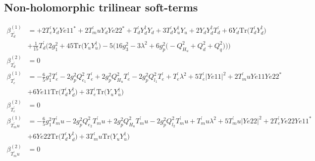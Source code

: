 \subsection{Non-holomorphic trilinear soft-terms}
{\allowdisplaybreaks  \begin{align} 
\beta_{T^{\prime}_d}^{(1)} & =  
+2 T^{\prime}_e Y_d Ye11^* +2 T^{\prime}_mu Y_d Ye22^* +{T^{\prime}_d  Y_{d}^{\dagger}  Y_d}+3 {T^{\prime}_d  Y_{u}^{\dagger}  Y_u} +2 {Y_d  Y_{d}^{\dagger}  T^{\prime}_d} +6 Y_d \mbox{Tr}\Big({T^{\prime}_d  Y_{d}^{\dagger}}\Big) \nonumber \\ 
 &+\frac{1}{15} T^{\prime}_d \Big(2 g_{1}^{2}  + 45 \mbox{Tr}\Big({Y_u  Y_{u}^{\dagger}}\Big)  -5 \Big(16 g_{3}^{2}  -3 \lambda^{2}  + 6 g_{p}^{2} \Big(- Q_{H_u}^{2}  + Q_{d}^{2} + Q_{q}^{2}\Big)\Big)\Big)\\ 
\beta_{T^{\prime}_d}^{(2)} & =  
0\\ 
\beta_{T^{\prime}_e}^{(1)} & =  
-\frac{6}{5} g_{1}^{2} T^{\prime}_e -2 g_{p}^{2} Q_{e_{1}}^{2} T^{\prime}_e +2 g_{p}^{2} Q_{H_u}^{2} T^{\prime}_e -2 g_{p}^{2} Q_{l_1}^{2} T^{\prime}_e +T^{\prime}_e \lambda^{2} +5 T^{\prime}_e |Ye11|^2 +2 T^{\prime}_mu Ye11 Ye22^* \nonumber \\ 
 &+6 Ye11 \mbox{Tr}\Big({T^{\prime}_d  Y_{d}^{\dagger}}\Big) +3 T^{\prime}_e \mbox{Tr}\Big({Y_u  Y_{u}^{\dagger}}\Big) \\ 
\beta_{T^{\prime}_e}^{(2)} & =  
0\\ 
\beta_{T^{\prime}_mu}^{(1)} & =  
-\frac{6}{5} g_{1}^{2} T^{\prime}_mu -2 g_{p}^{2} Q_{e_{2}}^{2} T^{\prime}_mu +2 g_{p}^{2} Q_{H_u}^{2} T^{\prime}_mu -2 g_{p}^{2} Q_{l_2}^{2} T^{\prime}_mu +T^{\prime}_mu \lambda^{2} +5 T^{\prime}_mu |Ye22|^2 +2 T^{\prime}_e Ye22 Ye11^* \nonumber \\ 
 &+6 Ye22 \mbox{Tr}\Big({T^{\prime}_d  Y_{d}^{\dagger}}\Big) +3 T^{\prime}_mu \mbox{Tr}\Big({Y_u  Y_{u}^{\dagger}}\Big) \\ 
\beta_{T^{\prime}_mu}^{(2)} & =  
0
\end{align}} 
